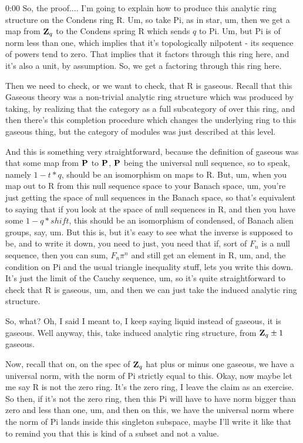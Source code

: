 \begin{unfinished}{0:00}
So, the proof.... I'm going to explain how to produce this analytic ring structure on the Condens ring R. Um, so take Pi, as in star, um, then we get a map from $\Z_q$ to the Condens spring R which sends $q$ to Pi. Um, but Pi is of norm less than one, which implies that it's topologically nilpotent - its sequence of powers tend to zero. That implies that it factors through this ring here, and it's also a unit, by assumption. So, we get a factoring through this ring here.

Then we need to check, or we want to check, that R is gaseous. Recall that this Gaseous theory was a non-trivial analytic ring structure which was produced by taking, by realizing that the category as a full subcategory of over this ring, and then there's this completion procedure which changes the underlying ring to this gaseous thing, but the category of modules was just described at this level.

And this is something very straightforward, because the definition of gaseous was that some map from $\P$ to $\P$, $\P$ being the universal null sequence, so to speak, namely $1 - t * q$, should be an isomorphism on maps to R. But, um, when you map out to R from this null sequence space to your Banach space, um, you're just getting the space of null sequences in the Banach space, so that's equivalent to saying that if you look at the space of null sequences in R, and then you have some $1 - q * shift$, this should be an isomorphism of condensed,  of Banach alien groups, say, um. But this is, but it's easy to see what the inverse is supposed to be, and to write it down, you need to just, you need that if, sort of $F_n$ is a null sequence, then you can sum, $F_n \pi^n$ and still get an element in R, um, and, the condition on Pi and the usual triangle inequality stuff, lets you write this down. It's just the limit of the Cauchy sequence, um, so it's quite straightforward to check that R is gaseous, um, and then we can just take the induced analytic ring structure.

So, what? Oh, I said I meant to, I keep saying liquid instead of gaseous, it is gaseous. Well anyway, this, take induced analytic ring structure, from $\Z_q \pm 1$ gaseous.

Now, recall that on, on the spec of $\Z_q$ hat plus or minus one gaseous, we have a universal norm, with the norm of Pi strictly equal to this. Okay, now maybe let me say R is not the zero ring. It's the zero ring, I leave the claim as an exercise. So then, if it's not the zero ring, then this Pi will have to have norm bigger than zero and less than one, um, and then on this, we have the universal norm where the norm of Pi lands inside this singleton subspace, maybe I'll write it like that to remind you that this is kind of a subset and not a value.


\end{unfinished}
